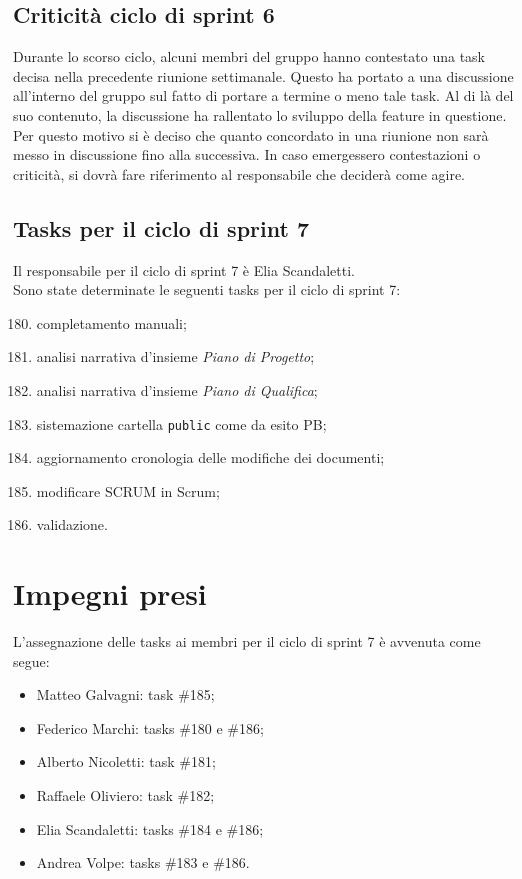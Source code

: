 \documentclass[a4paper, 12pt]{article}
\begin{document}
\subsection{Criticità ciclo di sprint 6}
Durante lo scorso ciclo, alcuni membri del gruppo hanno contestato una task decisa nella precedente riunione settimanale. Questo ha portato a una discussione all'interno del gruppo sul fatto di portare a termine o meno tale task. Al di là del suo contenuto, la discussione ha rallentato lo sviluppo della feature in questione. Per questo motivo si è deciso che quanto concordato in una riunione non sarà messo in discussione fino alla successiva. In caso emergessero contestazioni o criticità, si dovrà fare riferimento al responsabile che deciderà come agire.


\subsection{Tasks per il ciclo di sprint 7}
Il responsabile per il ciclo di sprint 7 è Elia Scandaletti. \\
Sono state determinate le seguenti tasks per il ciclo di sprint 7:
\begin{enumerate}[label=\textbf{\#\theenumi}]
  \setcounter{enumi}{179}
	\item completamento manuali;
  \item analisi narrativa d'insieme \textit{Piano di Progetto};
  \item analisi narrativa d'insieme \textit{Piano di Qualifica};
  \item sistemazione cartella \texttt{public} come da esito PB;
  \item aggiornamento cronologia delle modifiche dei documenti;
  \item modificare SCRUM in Scrum;
  \item validazione.
\end{enumerate}

\section{Impegni presi}
L'assegnazione delle tasks ai membri per il ciclo di sprint 7 è avvenuta come segue:
\begin{itemize}
  \item Matteo Galvagni: task \#185;
  \item Federico Marchi: tasks \#180 e \#186;
  \item Alberto Nicoletti: task \#181;
  \item Raffaele Oliviero: task \#182;
  \item Elia Scandaletti: tasks \#184 e \#186;
  \item Andrea Volpe: tasks \#183 e \#186.
\end{itemize}
\end{document}
